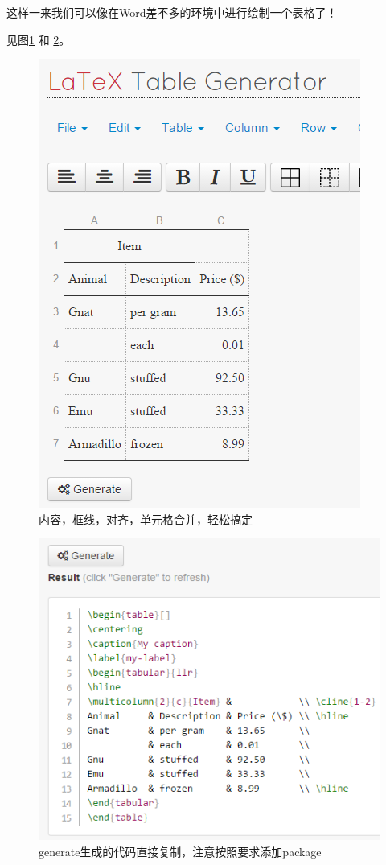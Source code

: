 \documentclass[12pt,a4paper,oneside]{book}
\begin{document}
{\par
这样一来我们可以像在Word差不多的环境中进行绘制一个表格了！
\par
见图\ref{pic:tb} 和 \ref{pic:tb2}。
\par
\begin{figure}[htp] 
\centering 
\includegraphics[scale=0.65]{Figures/tb.png}
\caption{内容，框线，对齐，单元格合并，轻松搞定~}%
\label{pic:tb}
\end{figure}

\par
\begin{figure}[htp] 
\centering 
\includegraphics[scale=0.65]{Figures/tb2.png}
\caption{generate生成的代码直接复制，注意按照要求添加package}%
\label{pic:tb2}
\end{figure}

}
\end{document}
